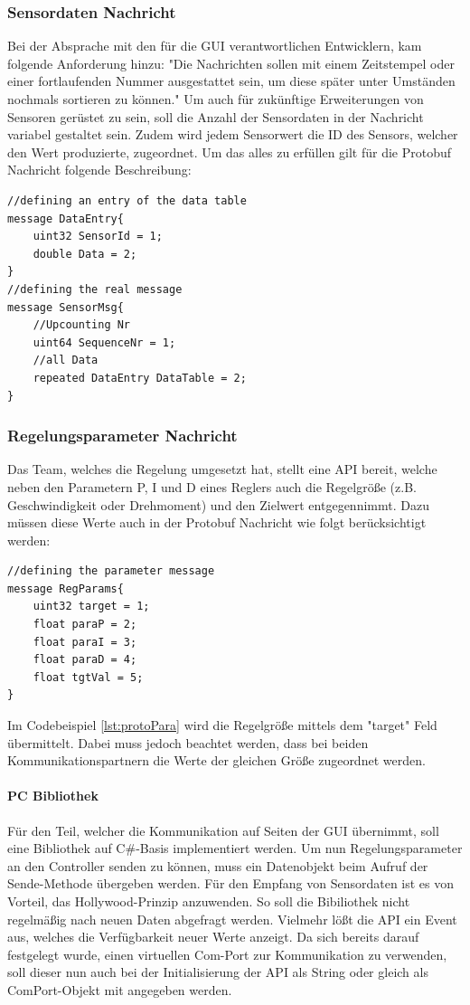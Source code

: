 \subsubsection{Sensordaten Nachricht}
Bei der Absprache mit den für die GUI verantwortlichen Entwicklern, kam folgende Anforderung hinzu: "Die Nachrichten sollen mit einem Zeitstempel oder einer fortlaufenden Nummer ausgestattet sein, um diese später unter Umständen nochmals sortieren zu können." Um auch für zukünftige Erweiterungen von Sensoren gerüstet zu sein, soll die Anzahl der Sensordaten in der Nachricht variabel gestaltet sein. Zudem wird jedem Sensorwert die ID des Sensors, welcher den Wert produzierte, zugeordnet. Um das alles zu erfüllen gilt für die Protobuf Nachricht folgende Beschreibung:
\begin{lstlisting}[caption=Beschreibung der Sensordaten Nachricht, label=lst:protoData]
//defining an entry of the data table
message DataEntry{
	uint32 SensorId = 1;
	double Data = 2;
}
//defining the real message
message SensorMsg{
	//Upcounting Nr
	uint64 SequenceNr = 1;
	//all Data
	repeated DataEntry DataTable = 2;
}
\end{lstlisting}
\subsubsection{Regelungsparameter Nachricht}
Das Team, welches die Regelung umgesetzt hat, stellt eine API bereit, welche neben den Parametern P, I und D eines Reglers auch die Regelgröße (z.B. Geschwindigkeit oder Drehmoment) und den Zielwert entgegennimmt. Dazu müssen diese Werte auch in der Protobuf Nachricht wie folgt berücksichtigt werden:
\begin{lstlisting}[caption=Beschreibung der Parameter Nachricht, label=lst:protoPara]
//defining the parameter message
message RegParams{
	uint32 target = 1;
	float paraP = 2;
	float paraI = 3;
	float paraD = 4;
	float tgtVal = 5;
}
\end{lstlisting}
Im Codebeispiel \ref{lst:protoPara} wird die Regelgröße mittels dem "target" Feld übermittelt. Dabei muss jedoch beachtet werden, dass bei beiden Kommunikationspartnern die Werte der gleichen Größe zugeordnet werden.
\paragraph{PC Bibliothek}
Für den Teil, welcher die Kommunikation auf Seiten der GUI übernimmt, soll eine Bibliothek auf C\#-Basis implementiert werden. Um nun Regelungsparameter an den Controller senden zu können, muss ein Datenobjekt beim Aufruf der Sende-Methode übergeben werden. Für den Empfang von Sensordaten ist es von Vorteil, das Hollywood-Prinzip anzuwenden. So soll die Bibiliothek nicht regelmäßig nach neuen Daten abgefragt werden. Vielmehr lößt die API ein Event aus, welches die Verfügbarkeit neuer Werte anzeigt. Da sich bereits darauf festgelegt wurde, einen virtuellen Com-Port zur Kommunikation zu verwenden, soll dieser nun auch bei der Initialisierung der API als String oder gleich als ComPort-Objekt mit angegeben werden. 
